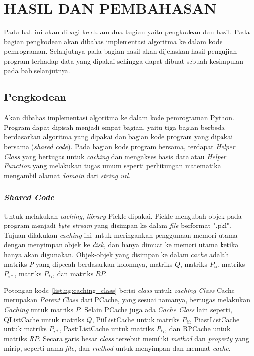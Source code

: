 
\chapter{HASIL DAN PEMBAHASAN}

Pada bab ini akan dibagi ke dalam dua bagian yaitu pengkodean dan hasil. Pada bagian pengkodean akan dibahas implementasi algoritma ke dalam kode pemrograman. Selanjutnya pada bagian hasil akan dijelaskan hasil pengujian program terhadap data yang dipakai sehingga dapat dibuat sebuah kesimpulan pada bab selanjutnya.

\section{Pengkodean}

Akan dibahas implementasi algoritma ke dalam kode pemrograman Python. Program dapat dipisah menjadi empat bagian, yaitu tiga bagian berbeda berdasarkan algoritma yang dipakai dan bagian kode program yang dipakai bersama (\textit{shared code}). Pada bagian kode program bersama, terdapat \textit{Helper Class} yang bertugas untuk \textit{caching} dan mengakses basis data atau \textit{Helper Function} yang melakukan tugas umum seperti perhitungan matematika, mengambil alamat \textit{domain} dari \textit{string url}.

\subsection{\textit{Shared Code}}

Untuk melakukan \textit{caching}, \textit{library} Pickle dipakai. Pickle mengubah objek pada program menjadi \textit{byte stream} yang disimpan ke dalam \textit{file} berformat ".pkl". Tujuan dilakukan \textit{caching} ini untuk meringankan penggunaan memori utama dengan menyimpan objek ke \textit{disk}, dan hanya dimuat ke memori utama ketika hanya akan digunakan. Objek-objek yang disimpan ke dalam \textit{cache} adalah matriks $P$ yang dipecah berdasarkan kolomnya, matriks $Q$, matriks $P_{ii}$, matriks $P_{i*}$, matriks $P_{*i}$, dan matriks $RP$. 

Potongan kode \ref{listing:caching_class} berisi \textit{class} untuk \textit{caching} \textit{Class} Cache merupakan \textit{Parent Class} dari PCache, yang sesuai namanya, bertugas melakukan \textit{Caching} untuk matriks $P$. Selain PCache juga ada \textit{Cache Class} lain seperti, QListCache untuk matriks $Q$, PiiListCache untuk matriks $P_{ii}$, PiastListCache untuk matriks $P_{i*}$, PastiListCache untuk matriks $P_{*i}$, dan RPCache untuk matriks $RP$. Secara garis besar \textit{class} tersebut memiliki \textit{method} dan \textit{property} yang mirip, seperti nama \textit{file}, dan \textit{method} untuk menyimpan dan memuat \textit{cache}.

